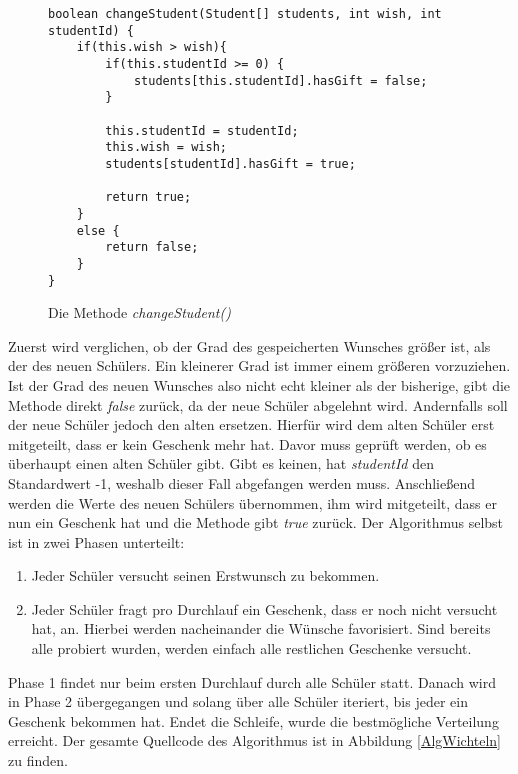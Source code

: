 \documentclass[a4paper, 12pt]{scrartcl}
\begin{document}
\begin{figure}[h]
\centering
\begin{lstlisting}
boolean changeStudent(Student[] students, int wish, int studentId) {
	if(this.wish > wish){
		if(this.studentId >= 0) {
			students[this.studentId].hasGift = false;
		}

		this.studentId = studentId;
		this.wish = wish;
		students[studentId].hasGift = true;
			
		return true;
	}
	else {
		return false;
	}
}
\end{lstlisting}
\caption{Die Methode \emph{changeStudent()}}
\end{figure}

Zuerst wird verglichen, ob der Grad des gespeicherten Wunsches größer ist, als der des neuen Schülers. Ein kleinerer Grad ist immer einem größeren vorzuziehen. Ist der Grad des neuen Wunsches also nicht echt kleiner als der bisherige, gibt die Methode direkt \emph{false} zurück, da der neue Schüler abgelehnt wird. Andernfalls soll der neue Schüler jedoch den alten ersetzen. Hierfür wird dem alten Schüler erst mitgeteilt, dass er kein Geschenk mehr hat. Davor muss geprüft werden, ob es überhaupt einen alten Schüler gibt. Gibt es keinen, hat \emph{studentId} den Standardwert -1, weshalb dieser Fall abgefangen werden muss. Anschließend werden die Werte des neuen Schülers übernommen, ihm wird mitgeteilt, dass er nun ein Geschenk hat und die Methode gibt \emph{true} zurück. Der Algorithmus selbst ist in zwei Phasen unterteilt:

\begin{enumerate}
    \item Jeder Schüler versucht seinen Erstwunsch zu bekommen.
    \item Jeder Schüler fragt pro Durchlauf ein Geschenk, dass er noch nicht versucht hat, an. Hierbei werden nacheinander die Wünsche favorisiert. Sind bereits alle probiert wurden, werden einfach alle restlichen Geschenke versucht.
\end{enumerate}

Phase 1 findet nur beim ersten Durchlauf durch alle Schüler statt. Danach wird in Phase 2 übergegangen und solang über alle Schüler iteriert, bis jeder ein Geschenk bekommen hat. Endet die Schleife, wurde die bestmögliche Verteilung erreicht. Der gesamte Quellcode des Algorithmus ist in Abbildung \ref{AlgWichteln} zu finden.
\end{document}
